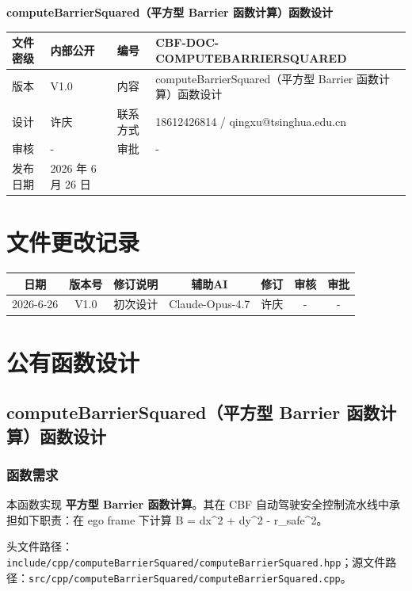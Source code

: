 \documentclass[a4paper,10pt]{article}
\begin{document}
\begin{titlepage}
    \centering
    {\Huge\textbf{computeBarrierSquared（平方型 Barrier 函数计算）函数设计}\par}
    \vspace{1.5cm}
    \renewcommand{\arraystretch}{1.5}
    \begin{tabular}{|l|l|l|l|}
        \hline
        文件密级 & 内部公开 & 编号 & CBF-DOC-COMPUTEBARRIERSQUARED \\ \hline
        版本 & V1.0 & 内容 & computeBarrierSquared（平方型 Barrier 函数计算）函数设计 \\ \hline
        设计 & 许庆 & 联系方式 & 18612426814 / qingxu@tsinghua.edu.cn \\ \hline
        审核 & - & 审批 & - \\ \hline
        发布日期 & 2026 年 6 月 26 日 & & \\ \hline
    \end{tabular}
    \vspace{1.5cm}
    \section*{文件更改记录}
    \begin{longtable}{|c|c|p{4cm}|c|c|c|c|}
        \hline
        日期 & 版本号 & 修订说明 & 辅助AI & 修订 & 审核 & 审批 \\ \hline
        2026-6-26 & V1.0 & 初次设计 & Claude-Opus-4.7 & 许庆 & - & - \\ \hline
    \end{longtable}
\end{titlepage}
\tableofcontents
\newpage
\section{公有函数设计}
\subsection{computeBarrierSquared（平方型 Barrier 函数计算）函数设计}
\subsubsection{函数需求}
\par 本函数实现 \textbf{平方型 Barrier 函数计算}。其在 CBF 自动驾驶安全控制流水线中承担如下职责：在 ego frame 下计算 B = dx\textasciicircum{}2 + dy\textasciicircum{}2 - r\_safe\textasciicircum{}2。
\par 头文件路径：\texttt{include/cpp/computeBarrierSquared/computeBarrierSquared.hpp}；源文件路径：\texttt{src/cpp/computeBarrierSquared/computeBarrierSquared.cpp}。
\end{document}
